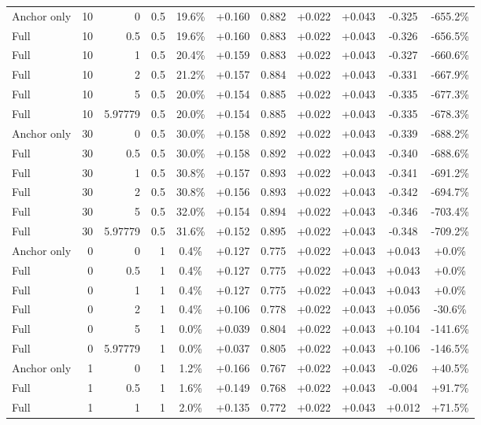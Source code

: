 \begin{table}[htbp]
\begin{tabular}{lrrrccccccc}
Anchor only & 10 & 0 & 0.5 & 19.6\% & +0.160 & 0.882 & +0.022 & +0.043 & -0.325 & -655.2\% \\
Full & 10 & 0.5 & 0.5 & 19.6\% & +0.160 & 0.883 & +0.022 & +0.043 & -0.326 & -656.5\% \\
Full & 10 & 1 & 0.5 & 20.4\% & +0.159 & 0.883 & +0.022 & +0.043 & -0.327 & -660.6\% \\
Full & 10 & 2 & 0.5 & 21.2\% & +0.157 & 0.884 & +0.022 & +0.043 & -0.331 & -667.9\% \\
Full & 10 & 5 & 0.5 & 20.0\% & +0.154 & 0.885 & +0.022 & +0.043 & -0.335 & -677.3\% \\
Full & 10 & 5.97779 & 0.5 & 20.0\% & +0.154 & 0.885 & +0.022 & +0.043 & -0.335 & -678.3\% \\
Anchor only & 30 & 0 & 0.5 & 30.0\% & +0.158 & 0.892 & +0.022 & +0.043 & -0.339 & -688.2\% \\
Full & 30 & 0.5 & 0.5 & 30.0\% & +0.158 & 0.892 & +0.022 & +0.043 & -0.340 & -688.6\% \\
Full & 30 & 1 & 0.5 & 30.8\% & +0.157 & 0.893 & +0.022 & +0.043 & -0.341 & -691.2\% \\
Full & 30 & 2 & 0.5 & 30.8\% & +0.156 & 0.893 & +0.022 & +0.043 & -0.342 & -694.7\% \\
Full & 30 & 5 & 0.5 & 32.0\% & +0.154 & 0.894 & +0.022 & +0.043 & -0.346 & -703.4\% \\
Full & 30 & 5.97779 & 0.5 & 31.6\% & +0.152 & 0.895 & +0.022 & +0.043 & -0.348 & -709.2\% \\
Anchor only & 0 & 0 & 1 & 0.4\% & +0.127 & 0.775 & +0.022 & +0.043 & +0.043 & +0.0\% \\
Full & 0 & 0.5 & 1 & 0.4\% & +0.127 & 0.775 & +0.022 & +0.043 & +0.043 & +0.0\% \\
Full & 0 & 1 & 1 & 0.4\% & +0.127 & 0.775 & +0.022 & +0.043 & +0.043 & +0.0\% \\
Full & 0 & 2 & 1 & 0.4\% & +0.106 & 0.778 & +0.022 & +0.043 & +0.056 & -30.6\% \\
Full & 0 & 5 & 1 & 0.0\% & +0.039 & 0.804 & +0.022 & +0.043 & +0.104 & -141.6\% \\
Full & 0 & 5.97779 & 1 & 0.0\% & +0.037 & 0.805 & +0.022 & +0.043 & +0.106 & -146.5\% \\
Anchor only & 1 & 0 & 1 & 1.2\% & +0.166 & 0.767 & +0.022 & +0.043 & -0.026 & +40.5\% \\
Full & 1 & 0.5 & 1 & 1.6\% & +0.149 & 0.768 & +0.022 & +0.043 & -0.004 & +91.7\% \\
Full & 1 & 1 & 1 & 2.0\% & +0.135 & 0.772 & +0.022 & +0.043 & +0.012 & +71.5\% \\

\end{tabular}
\end{table}
